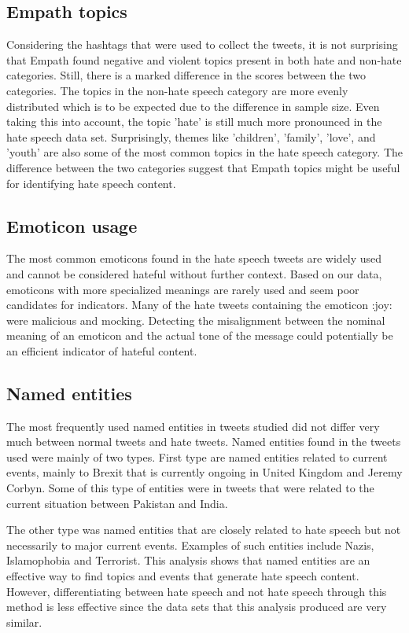 \documentclass[conference]{IEEEtran}
\begin{document}
\subsection{Empath topics}
Considering the hashtags that were used to collect the tweets, 
it is not surprising that Empath found negative and violent topics present 
in both hate and non-hate categories. Still, there is a marked difference in 
the scores between the two categories. The topics in the non-hate speech category 
are more evenly distributed which is to be expected due to the difference in sample size.
Even taking this into account, the topic 'hate' is still much more pronounced in the hate speech 
data set.  Surprisingly, themes like 'children', 'family', 'love', and 'youth' are also some of the 
most common topics in the hate speech category. The difference between the two categories suggest 
that Empath topics might be useful for identifying hate speech content.

\subsection{Emoticon usage}
The most common emoticons found in the hate speech tweets are widely used and cannot be considered hateful 
without further context. Based on our data, emoticons with more specialized meanings are rarely used and 
seem poor candidates for indicators. 
Many of the hate tweets containing the emoticon :joy: were malicious and mocking. 
Detecting the misalignment between the nominal meaning of an emoticon and the actual tone of the message could 
potentially be an efficient indicator of hateful content.

\subsection{Named entities}
The most frequently used named entities in tweets studied did not differ very much between normal tweets 
and hate tweets. Named entities found in the tweets used were mainly of two types. First type are named 
entities related to current events, mainly to Brexit that is currently ongoing in United Kingdom and 
Jeremy Corbyn. Some of this type of entities were in tweets that were related to the current situation 
between Pakistan and India.

The other type was named entities that are closely related to hate speech but not necessarily to major current events. 
Examples of such entities include Nazis, Islamophobia and Terrorist.
This analysis shows that named entities are an effective way to find topics and events that generate 
hate speech content. However, differentiating between hate speech and not hate speech through this 
method is less effective since the data sets that this analysis produced are very similar. 
\end{document}
